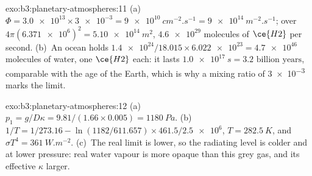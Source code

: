 \begin{solution}{exo:b3:planetary-atmospheres:11}
(a)~$\Phi = \num{3.0e13}\times\num{3e-3} = \qty{9e10}{cm^{-2}.s^{-1}} =
\qty{9e14}{m^{-2}.s^{-1}}$; over $4\pi(\num{6.371e6})^2 =
\qty{5.10e14}{m^2}$, $\num{4.6e29}$ molecules of $\ce{H2}$ per second.
(b)~An ocean holds $\num{1.4e24}/18.015\times\num{6.022e23} =
\num{4.7e46}$ molecules of water, one $\ce{H2}$ each: it lasts
$\qty{1.0e17}{s} = \num{3.2}\text{ billion years}$, comparable with the age of
the Earth, which is why a mixing ratio of \num{3e-3} marks the  limit.
\end{solution}

\begin{solution}{exo:b3:planetary-atmospheres:12}
(a)~$p_1 = g/D\kappa = 9.81/(1.66\times0.005) = \qty{1180}{Pa}$.
(b)~$1/T = 1/273.16 - \ln(1182/611.657)\times461.5/\num{2.5e6}$, $T =
\qty{282.5}{K}$, and $\sigma T^4 = \qty{361}{W.m^{-2}}$. (c)~The real limit
is lower, so the radiating level is colder and at lower pressure: real
water vapour is more opaque than this grey gas, and its effective $\kappa$
larger.
\end{solution}

